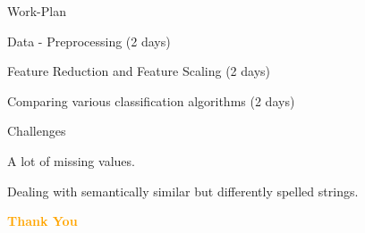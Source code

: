 \documentclass[14pt]{beamer}
\begin{document}
\begin{frame}{Work-Plan}
\pause
 \begin{fullpageitemize}
  \item\begin{center} Data - Preprocessing (2 days) \end{center}
  \item\begin{center} Feature Reduction and Feature Scaling (2 days)\end{center}
  \item\begin{center}Comparing various classification algorithms (2 days) \end{center}
 \end{fullpageitemize}
\end{frame}

\begin{frame}{Challenges}
\pause
 \begin{fullpageitemize}
  \item\begin{center} A lot of missing values. \end{center}
  \item\begin{center} Dealing with semantically similar but differently spelled strings. \end{center}
 \end{fullpageitemize}
 \end{frame}
 \begin{frame}{}
 \centering
            \Huge\bfseries
        \textcolor{orange}{Thank You}
\end{frame}
\end{document}
